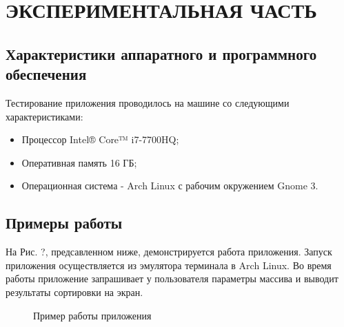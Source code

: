 \documentclass[a4paper,12pt]{article}
\begin{document}
\newpage
\section{ЭКСПЕРИМЕНТАЛЬНАЯ ЧАСТЬ}
\subsection{Характеристики аппаратного и программного обеспечения}
Тестирование приложения проводилось на машине со следующими характеристиками:\\
\begin{itemize}
\item Процессор Intel® Core™ i7-7700HQ;
\item Оперативная память 16 ГБ;
\item Операционная система - Arch Linux с рабочим окружением Gnome 3.
\end{itemize}

\newpage
\subsection{Примеры работы}
На Рис. ?, предсавленном ниже, демонстрируется работа приложения. Запуск приложения осуществляется из эмулятора терминала в Arch Linux. Во время работы приложение запрашивает у пользователя параметры массива и выводит результаты сортировки на экран.
\begin{figure}[h]
\caption{Пример работы приложения}
\label{images:example}
\end{figure}

\newpage
\end{document}
